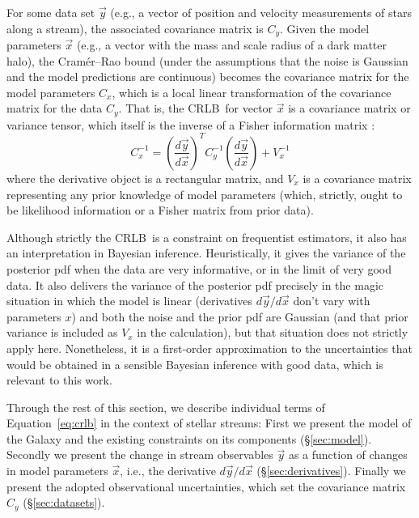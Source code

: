 \documentclass[modern]{aastex61}
\newcommand{\acronym}[1]{{\small{#1}}}
\newcommand{\CRLB}{\acronym{CRLB}}
\begin{document}
For some data set $\vec{y}$ (e.g., a vector of position and velocity measurements of stars along a stream), the associated covariance matrix is $C_y$.
Given the model parameters $\vec{x}$ (e.g., a vector with the mass and scale radius of a dark matter halo), the Cram\' er--Rao bound (under the assumptions that the noise is Gaussian and the model predictions are continuous) becomes the covariance matrix for the model parameters $C_x$, which is a local linear transformation of the covariance matrix for the data $C_y$.
That is, the \CRLB\ for vector $\vec{x}$ is a covariance matrix or variance tensor, which itself is the inverse of a Fisher information matrix \citep{fisher}:
\begin{equation}
C_x^{-1} = \left(\frac{d\vec{y}}{d\vec{x}}\right)^{T} C_y^{-1} \left(\frac{d\vec{y}}{d\vec{x}}\right) + V_x^{-1}
\label{eq:crlb}
\end{equation}
where the derivative object is a rectangular matrix, and $V_x$ is a covariance matrix representing any prior knowledge of model parameters (which, strictly, ought to be likelihood information or a Fisher matrix from prior data).

Although strictly the \CRLB\ is a constraint on frequentist estimators, it also has an interpretation in Bayesian inference.
Heuristically, it gives the variance of the posterior pdf when the data are very informative, or in the limit of very good data.
It also delivers the variance of the posterior pdf precisely in the magic situation in which the model is linear (derivatives $d\vec{y}/d\vec{x}$ don't vary with parameters $x$) and both the noise and the prior pdf are Gaussian (and that prior variance is included as $V_x$ in the calculation), but that situation does not strictly apply here.
Nonetheless, it is a first-order approximation to the uncertainties that would be obtained in a sensible Bayesian inference with good data, which is relevant to this work.

Through the rest of this section, we describe individual terms of Equation~\ref{eq:crlb} in the context of stellar streams:
First we present the model of the Galaxy and the existing constraints on its components (\S\ref{sec:model}).
Secondly we present the change in stream observables $\vec{y}$ as a function of changes in model parameters $\vec{x}$, i.e., the derivative $d\vec{y}/d\vec{x}$ (\S\ref{sec:derivatives}).
Finally we present the adopted observational uncertainties, which set the covariance matrix $C_y$ (\S\ref{sec:datasets}).
\end{document}
